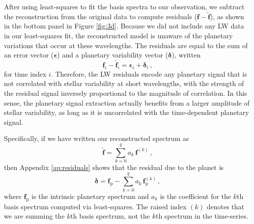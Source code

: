 \documentclass[twocolumn,linenumbers]{aastex7}
\begin{document}

After using least-squares to fit the basis spectra to our observation, we subtract the reconstruction from the original data to compute residuals ($\bm{f} - \tilde{\bm{f}}$), as shown in the bottom panel in Figure \ref{fig:3d}. Because we did not include any LW data in our least-squares fit, the reconstructed model is unaware of the planetary variations that occur at these wavelengths. The residuals are equal to the sum of an error vector ($\bm{\epsilon}$) and a planetary variability vector ($\bm{\delta}$), written
\begin{equation}\label{eq:def-residuals}
    \bm{f}_i - \tilde{\bm{f}}_i = \bm{\epsilon}_i + \bm{\delta}_i\, ,
\end{equation}
for time index $i$. Therefore, the LW residuals encode any planetary signal that is not correlated with stellar variability at short wavelengths, with the strength of the residual signal inversely proportional to the magnitude of correlation. In this sense, the planetary signal extraction actually benefits from a larger amplitude of stellar variability, as long as it is uncorrelated with the time-dependent planetary signal.

Specifically, if we have written our reconstructed spectrum as
\begin{equation}\label{eq:def-frec}
    \tilde{\bm{f}} = \sum_{k=0}^q a_{k}\,\bm{f}^{(k)}\, ,
\end{equation}
then Appendix \ref{ap:residuals} shows that the residual due to the planet is
\begin{equation}\label{eq:def-delta}
    \bm{\delta} = \bm{f}_\text{p} - \sum_{k=0}^q a_{k}\,\bm{f}_{\text{p}}^{(k)}\, ,
\end{equation}
where $\bm{f}_\text{p}$ is the intrinsic planetary spectrum and $a_k$ is the coefficient for the $k$th basis spectrum computed via least-squares. The raised index $(k)$ denotes that we are summing the $k$th basis spectrum, not the $k$th spectrum in the time-series. 
\end{document}
